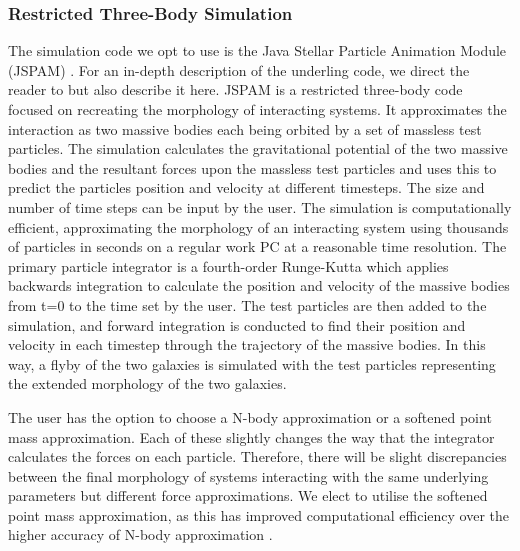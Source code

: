 \subsubsection{Restricted Three-Body Simulation}\label{sec:apyspam}
The simulation code we opt to use is the Java Stellar Particle Animation Module (JSPAM) \citep{2016A&C....16...26W}. For an in-depth description of the underling code, we direct the reader to \citet{1990AJ....100.1477W,2016A&C....16...26W} but also describe it here. JSPAM is a restricted three-body code focused on recreating the morphology of interacting systems. It approximates the interaction as two massive bodies each being orbited by a set of massless test particles. The simulation calculates the gravitational potential of the two massive bodies and the resultant forces upon the massless test particles and uses this to predict the particles position and velocity at different timesteps. The size and number of time steps can be input by the user. The simulation is computationally efficient, approximating the morphology of an interacting system using thousands of particles in seconds on a regular work PC at a reasonable time resolution. The primary particle integrator is a fourth-order Runge-Kutta which applies backwards integration to calculate the position and velocity of the massive bodies from t=0 to the time set by the user. The test particles are then added to the simulation, and forward integration is conducted to find their position and velocity in each timestep through the trajectory of the massive bodies. In this way, a flyby of the two galaxies is simulated with the test particles representing the extended morphology of the two galaxies. 

The user has the option to choose a N-body approximation or a softened point mass approximation. Each of these slightly changes the way that the integrator calculates the forces on each particle. Therefore, there will be slight discrepancies between the final morphology of systems interacting with the same underlying parameters but different force approximations. We elect to utilise the softened point mass approximation, as this has improved computational efficiency over the higher accuracy of N-body approximation \citep[for more on this see][]{2016A&C....16...26W}. 

